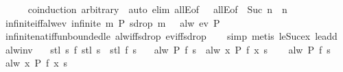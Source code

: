 \begin{isabellebody}
\ \ \ \ \isamarkupfalse%
\ {\isacharparenleft}coinduction\ arbitrary{\isacharcolon}\ {\isasymomega}{\isacharparenright}\ {\isacharparenleft}auto\ elim{\isacharcolon}\ allE{\isacharbrackleft}of\ {\isacharunderscore}\ {}{\isacharbrackright}\ allE{\isacharbrackleft}of\ {\isacharunderscore}\ {\isachardoublequoteopen}Suc\ n{\isachardoublequoteclose}\ \ n{\isacharbrackright}{\isacharparenright}\isanewline
{}\isamarkupfalse%
%
\endisatagproof
{\isafoldproof}%
%
\isadelimproof
\isanewline
%
\endisadelimproof
\isanewline
{}\isamarkupfalse%
\ infinite{\isacharunderscore}iff{\isacharunderscore}alw{\isacharunderscore}ev{\isacharcolon}\ {\isachardoublequoteopen}infinite\ {\isacharbraceleft}m{\isachardot}\ P\ {\isacharparenleft}sdrop\ m\ {\isasymomega}{\isacharparenright}{\isacharbraceright}\ {\isasymlongleftrightarrow}\ alw\ {\isacharparenleft}ev\ P{\isacharparenright}\ {\isasymomega}{\isachardoublequoteclose}\isanewline
%
\isadelimproof
\ \ %
\endisadelimproof
%
\isatagproof
{}\isamarkupfalse%
\ infinite{\isacharunderscore}nat{\isacharunderscore}iff{\isacharunderscore}unbounded{\isacharunderscore}le\ alw{\isacharunderscore}iff{\isacharunderscore}sdrop\ ev{\isacharunderscore}iff{\isacharunderscore}sdrop\isanewline
\ \ \isamarkupfalse%
\ simp\ {\isacharparenleft}metis\ le{\isacharunderscore}Suc{\isacharunderscore}ex\ le{\isacharunderscore}add{}{\isacharparenright}%
\endisatagproof
{\isafoldproof}%
%
\isadelimproof
\isanewline
%
\endisadelimproof
\isanewline
{}\isamarkupfalse%
\ alw{\isacharunderscore}inv{\isacharcolon}\isanewline
\ \ \ stl{\isacharcolon}\ {\isachardoublequoteopen}{\isasymAnd}s{\isachardot}\ f\ {\isacharparenleft}stl\ s{\isacharparenright}\ {\isacharequal}\ stl\ {\isacharparenleft}f\ s{\isacharparenright}{\isachardoublequoteclose}\isanewline
\ \ \ {\isachardoublequoteopen}alw\ P\ {\isacharparenleft}f\ s{\isacharparenright}\ {\isasymlongleftrightarrow}\ alw\ {\isacharparenleft}{\isasymlambda}x{\isachardot}\ P\ {\isacharparenleft}f\ x{\isacharparenright}{\isacharparenright}\ s{\isachardoublequoteclose}\isanewline
%
\isadelimproof
%
\endisadelimproof
%
\isatagproof
{}\isamarkupfalse%
\isanewline
\ \ \isamarkupfalse%
\ {\isachardoublequoteopen}alw\ P\ {\isacharparenleft}f\ s{\isacharparenright}{\isachardoublequoteclose}\ \isamarkupfalse%
\ \isamarkupfalse%
\ {\isachardoublequoteopen}alw\ {\isacharparenleft}{\isasymlambda}x{\isachardot}\ P\ {\isacharparenleft}f\ x{\isacharparenright}{\isacharparenright}\ s{\isachardoublequoteclose}\isanewline

\end{isabellebody}
